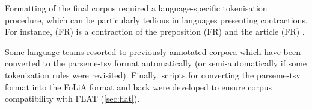\documentclass[output=paper,modfonts]{langscibook}
\begin{document}
Formatting of the final corpus required a language-specific tokenisation procedure, which can be particularly tedious in languages presenting contractions. For instance, %
(FR)  is a contraction of the preposition (FR)  and the article (FR) . 

Some language teams resorted to previously annotated corpora %
which have been converted to the parseme-tsv format automatically (or semi-automatically if some tokenisation rules were revisited). 
Finally, scripts for converting the parseme-tsv format into the FoLiA format and back were developed to ensure corpus compatibility with FLAT (\ref{sec:flat}).


\end{document}
